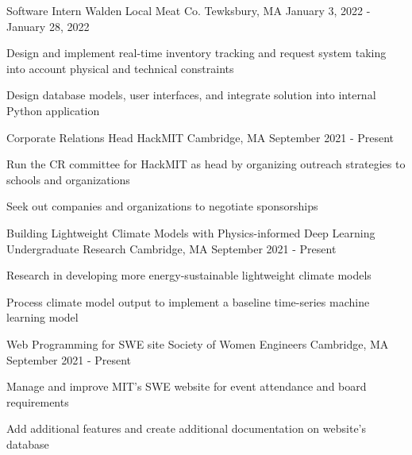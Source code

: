 \documentclass[12pt, letterpaper]{awesome-cv}
\begin{document}
\begin{cventries}
  \cventry
      {Software Intern} %
      {Walden Local Meat Co.} %
      {Tewksbury, MA} %
      {January 3, 2022 - January 28, 2022} %
      {
        \begin{cvitems} %
          \item {Design and implement real-time inventory tracking and request system taking into account physical and technical constraints}
          \item {Design database models, user interfaces, and integrate solution into internal Python application}
      \end{cvitems}
    }

  \cventry
    {Corporate Relations Head} %
    {HackMIT} %
    {Cambridge, MA} %
    {September 2021 - Present} %
    {
      \begin{cvitems} %
        \item {Run the CR committee for HackMIT as head by organizing outreach strategies to schools and organizations}
        \item {Seek out companies and organizations to negotiate sponsorships}
      \end{cvitems}
    }

  \cventry
    {Building Lightweight Climate Models with Physics-informed Deep Learning } %
    {Undergraduate Research} %
    {Cambridge, MA} %
    {September 2021 - Present} %
    {
      \begin{cvitems} %
        \item {Research in developing more energy-sustainable lightweight climate models}
        \item {Process climate model output to implement a baseline time-series machine learning model}
      \end{cvitems}
    }

    \cventry
    {Web Programming for SWE site} %
    {Society of Women Engineers} %
    {Cambridge, MA} %
    {September 2021 - Present} %
    {
      \begin{cvitems} %
        \item {Manage and improve MIT's SWE website for event attendance and board requirements}
        \item {Add additional features and create additional documentation on website's database}
    \end{cvitems}
    }


\end{cventries}
\end{document}
